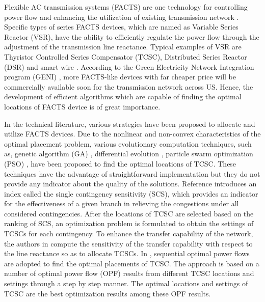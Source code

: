 \documentclass[journal]{IEEEtran}
\begin{document}
Flexible AC transmission systems (FACTS) are one technology for controlling power flow and enhancing the utilization of existing transmission network \cite{mybibb:FACTS1,mybibb:FACTS2,mybibb:SSSC,mybibb:flow_control_FACTS1}. Specific types of series FACTS devices, which are named as Variable Series Reactor (VSR), have the ability to efficiently regulate the power flow through the adjustment of the transmission line reactance. Typical examples of VSR are Thyristor Controlled Series Compensator (TCSC), Distributed Series Reactor (DSR) and smart wire \cite{mybibb:ETH_TCSC1,mybibb:dsr_pd,mybibb:smart_wire}. According to the Green Electricity Network Integration program (GENI) \cite{mybibb:geni}, more FACTS-like devices \cite{mybibb:Aleks} with far cheaper price will be commercially available soon for the transmission network across US. Hence, the development of efficient algorithms which are capable of finding the optimal locations of FACTS device is of great importance.         

In the technical literature, various strategies have been proposed to allocate and utilize FACTS devices. Due to the nonlinear and non-convex characteristics of the optimal placement problem, various evolutionary computation techniques, such as, genetic algorithm (GA) \cite{mybibb:GAFACTS,mybibb:GA_FACT_market}, differential evolution \cite{mybibb:differentialevoluation}, particle swarm optimization (PSO) \cite{mybibb:PSO_FACTS}, have been proposed to find the optimal locations of TCSC. These techniques have the advantage of straightforward implementation but they do not provide any indicator about the quality of the solutions. Reference \cite{mybibb:TCSC_ali} introduces an index called the single contingency sensitivity (SCS), which provides an indicator for the effectiveness of a given branch in relieving the congestions under all considered contingencies. After the locations of TCSC are selected based on the ranking of SCS, an optimization problem is formulated to obtain the settings of TCSCs for each contingency. To enhance the transfer capability of the network, the authors in \cite{mybibb:TCSCsens} compute the sensitivity of the transfer capability with respect to the line reactance so as to allocate TCSCs. In \cite{mybibb:TCSC_cost_recovery}, sequential optimal power flows are adopted to find the optimal placements of TCSC. The approach is based on a number of optimal power flow (OPF) results from different TCSC locations and settings through a step by step manner. The optimal locations and settings of TCSC are the best optimization results among these OPF results.  
\end{document}
